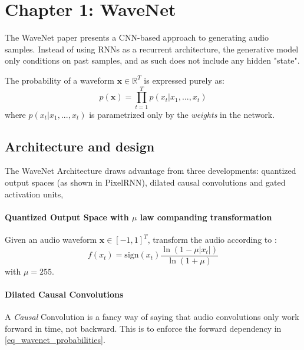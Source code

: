 \section{Chapter 1: WaveNet}
The WaveNet paper presents a CNN-based approach to generating audio samples. \cite{oord_wavenet_2016}
Instead of using RNNs as a recurrent architecture, the generative model only conditions on past samples, and as such does not include any hidden "state".

The probability of a waveform \(\mathbf{x}\in \mathbb{R}^T\) is expressed purely as:
\begin{equation}\label{eq_wavenet_probabilities}
    p(\mathbf{x}) = \prod_{t=1}^T  p(x_t | x_1, ..., x_t )
\end{equation}
where $ p(x_t | x_1, ..., x_t ) $ is parametrized only by the \textit{weights} in the network. 


\subsection{Architecture and design}
The WaveNet Architecture draws advantage from three developments: quantized output spaces (as shown in PixelRNN), dilated causal convolutions and gated activation units,

\paragraph{Quantized Output Space with $\mu$ law companding transformation}
Given an audio waveform \(\mathbf{x} \in [-1,1]^T\), transform the audio according to :
\begin{equation}
    f(x_t) = \textrm{sign}(x_t) \frac{ \ln(1 - \mu|x_t|  )}{ \ln(1 + \mu)  }
\end{equation} 
with \(\mu = 255\).


\paragraph{Dilated Causal Convolutions}
A \textit{Causal} Convolution is a fancy way of saying that audio convolutions only work forward in time, not backward.
This is to enforce the forward dependency in \cref{eq_wavenet_probabilities}.

